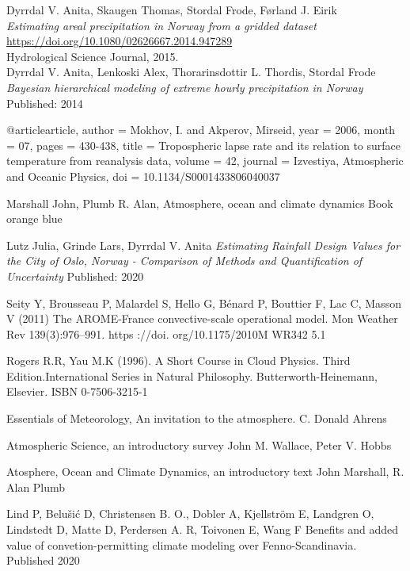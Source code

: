 \begin{thebibliography}{9}

Dyrrdal V. Anita, Skaugen Thomas, Stordal Frode, Førland J. Eirik \\
\textit{Estimating areal precipitation in Norway from a gridded dataset}\\
\url{https://doi.org/10.1080/02626667.2014.947289} \\
Hydrological Science Journal, 2015.\\

Dyrrdal V. Anita, Lenkoski Alex, Thorarinsdottir L. Thordis, Stordal Frode
\textit{Bayesian hierarchical modeling of extreme hourly precipitation in Norway}
Published: 2014

@article{article,
author = {Mokhov, I. and Akperov, Mirseid},
year = {2006},
month = {07},
pages = {430-438},
title = {Tropospheric lapse rate and its relation to surface temperature from reanalysis data},
volume = {42},
journal = {Izvestiya, Atmospheric and Oceanic Physics},
doi = {10.1134/S0001433806040037}
}

Marshall John, Plumb R. Alan, Atmosphere, ocean and climate dynamics
Book orange blue

Lutz Julia, Grinde Lars, Dyrrdal V. Anita
\textit{Estimating Rainfall Design Values for the City of Oslo, Norway - Comparison of Methods and Quantification of Uncertainty}
Published: 2020

Seity Y, Brousseau P, Malardel S, Hello G, Bénard P, Bouttier F,
Lac C, Masson V (2011) The AROME-France convective-scale
operational model. Mon Weather Rev 139(3):976–991. https ://doi.
org/10.1175/2010M WR342 5.1

Rogers R.R, Yau M.K (1996). A Short Course in Cloud Physics. Third Edition.International Series in Natural Philosophy.
Butterworth-Heinemann, Elsevier.
ISBN 0-7506-3215-1

Essentials of Meteorology, An invitation to the atmosphere.
C. Donald Ahrens

Atmospheric Science, an introductory survey
John M. Wallace, Peter V. Hobbs

Atosphere, Ocean and Climate Dynamics, an introductory text
John Marshall, R. Alan Plumb

Lind P, Belušić D, Christensen B. O., Dobler A, Kjellström E, Landgren O, Lindstedt D, Matte D, Perdersen A. R, Toivonen E, Wang F
Benefits and added value of convetion-permitting climate modeling over Fenno-Scandinavia.
Published 2020


\end{thebibliography}
